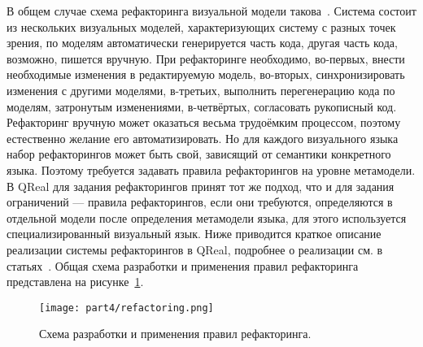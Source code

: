 В общем случае схема рефакторинга визуальной модели такова~\cite{mens2007challenges}.
Система состоит из нескольких визуальных моделей, характеризующих систему с разных точек зрения, по моделям автоматически 
генерируется часть кода, другая часть кода, возможно, пишется вручную. При рефакторинге 
необходимо, во-первых, внести необходимые изменения в редактируемую модель, во-вторых, 
синхронизировать изменения с другими моделями, в-третьих, выполнить перегенерацию кода 
по моделям, затронутым изменениями, в-четвёртых, согласовать рукописный код. Рефакторинг 
вручную может оказаться весьма трудоёмким процессом, поэтому естественно желание его 
автоматизировать. Но для каждого визуального языка набор рефакторингов может быть свой, 
зависящий от семантики конкретного языка. Поэтому требуется задавать правила рефакторингов 
на уровне метамодели. В QReal для задания рефакторингов принят тот же подход, что и 
для задания ограничений --- правила рефакторингов, если они требуются, определяются 
в отдельной модели после определения метамодели языка, для этого используется специализированный 
визуальный язык. Ниже приводится краткое описание реализации системы рефакторингов в QReal, 
подробнее о реализации см. в статьях~\cite{kuzenkova2013refactoring, kuzenkova2012refactorings}. 
Общая схема разработки и применения правил рефакторинга представлена на рисунке~\ref{image:refactoring}.

\begin{figure} [ht]
	\begin{center}
		\texttt{[image: part4/refactoring.png]}
		\caption{Схема разработки и применения правил рефакторинга.}
		\label{image:refactoring}
	\end{center}
\end{figure}

